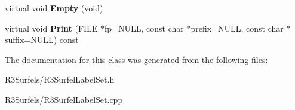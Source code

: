 \begin{DoxyCompactItemize}
\item 
virtual void {\bfseries Empty} (void)\hypertarget{class_r3_surfel_label_set_adcc6cdf9bb1d2f0f600bb81d1c464cce}{}\label{class_r3_surfel_label_set_adcc6cdf9bb1d2f0f600bb81d1c464cce}

\item 
virtual void {\bfseries Print} (F\+I\+LE $\ast$fp=N\+U\+LL, const char $\ast$prefix=N\+U\+LL, const char $\ast$suffix=N\+U\+LL) const \hypertarget{class_r3_surfel_label_set_ad54221d0f5850bc0559d733e595cc9bc}{}\label{class_r3_surfel_label_set_ad54221d0f5850bc0559d733e595cc9bc}

\end{DoxyCompactItemize}


The documentation for this class was generated from the following files\+:\begin{DoxyCompactItemize}
\item 
R3\+Surfels/R3\+Surfel\+Label\+Set.\+h\item 
R3\+Surfels/R3\+Surfel\+Label\+Set.\+cpp\end{DoxyCompactItemize}
